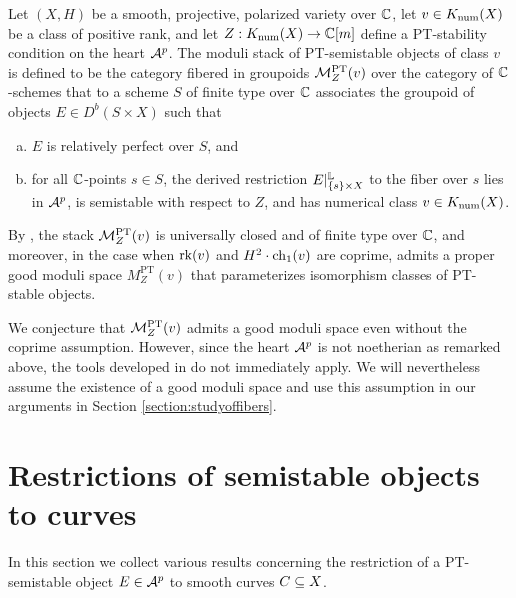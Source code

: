 Let $(X, H)$ be a smooth, projective, polarized variety over $\mathbb{C}$, let $v \in K_{\mathrm{num}}(X)$ be a class of positive rank, and let $Z: K_{\mathrm{num}}(X) \to \mathbb{C}[m]$ define a PT-stability condition on the heart $\mathcal{A}^p$. The moduli stack of PT-semistable objects of class $v$ is defined to be the category fibered in groupoids $\mathcal{M}^{\text{PT}}_Z(v)$ over the category of $\mathbb{C}$-schemes that to a scheme $S$ of finite type over $\mathbb{C}$ associates the groupoid of objects $E \in D^b(S \times X)$ such that
\begin{enumerate}[(a)]
    \item $E$ is relatively perfect over $S$, and
    \item  for all $\mathbb{C}$-points $s \in S$, the derived restriction $E|^{\mathbb{L}}_{\{s\}\times X}$ to the fiber over $s$ lies in $\mathcal{A}^p$, is semistable with respect to $Z$, and has numerical class $v \in K_{\mathrm{num}}(X)$.
\end{enumerate}
By \cite[Theorem 1.1]{lo-PT2}, the stack $\mathcal{M}^{\text{PT}}_Z(v)$ is universally closed and of finite type over $\mathbb{C}$, and moreover, in the case when $\operatorname{\mathrm{rk}}(v)$ and $H^2 \cdot \operatorname{\mathrm{ch}}_1(v)$ are coprime, admits a proper good moduli space $M^{\text{PT}}_Z(v)$ that parameterizes isomorphism classes of PT-stable objects.

We conjecture that $\mathcal{M}^{\text{PT}}_Z(v)$ admits a good moduli space even without the coprime assumption. However, since the heart $\mathcal{A}^p$ is not noetherian as remarked above, the tools developed in \cite[Section 7]{AHLH} do not immediately apply. We will nevertheless assume the existence of a good moduli space and use this assumption in our arguments in Section \ref{section:studyoffibers}.


\section{Restrictions of semistable objects to curves}

In this section we collect various results concerning the restriction of a PT-semistable object $E \in \mathcal{A}^p$ to smooth curves $C \subseteq X$.

